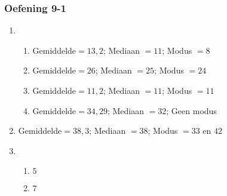 {\begin{multicols}{3}
\subsubsection*{Oefening 9-1} %
\begin{enumerate}[noitemsep, label=\textbf{\arabic*}.]
\item %
\begin{enumerate}[noitemsep, label=\textbf{(\alph*)} ]
\item Gemiddelde$= 13,2$; Mediaan $= 11$; Modus  $= 8$ %
\item Gemiddelde$= 26$; Mediaan $= 25$; Modus  $= 24$%
\item Gemiddelde$=11,2$; Mediaan $= 11$; Modus  $=11$%
\item Gemiddelde$=34,29$; Mediaan $=32$; Geen modus %
\end{enumerate}
\item Gemiddelde$=38,3$; Mediaan $= 38$; Modus  $= 33$ en $42$%
\item %
\begin{enumerate}[noitemsep, label=\textbf{(\alph*)} ]
  \item $5$%
  \item $7$%
  \end{enumerate}




\end{enumerate}
\end{multicols}}
